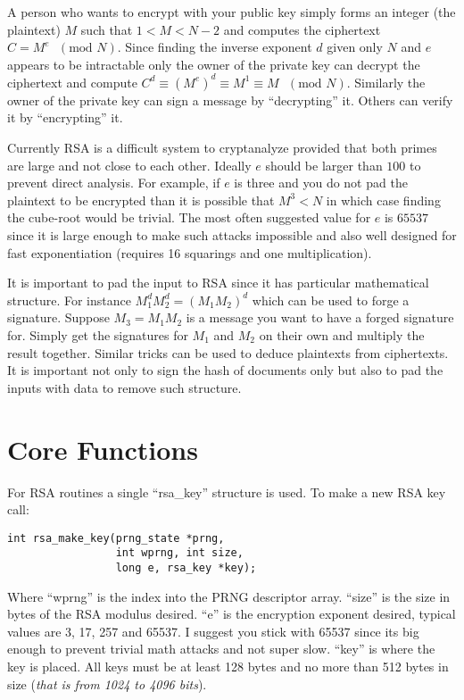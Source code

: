 \documentclass[b5paper]{book}
\begin{document}
A person who wants to encrypt with your public key simply forms an integer (the plaintext) $M$ such that 
$1 < M < N-2$ and computes the ciphertext $C = M^e\mbox{ }(\mbox{mod }N)$.  Since finding the inverse exponent $d$
given only $N$ and $e$ appears to be intractable only the owner of the private key can decrypt the ciphertext and compute
$C^d \equiv \left (M^e \right)^d \equiv M^1 \equiv M\mbox{ }(\mbox{mod }N)$.  Similarly the owner of the private key 
can sign a message by ``decrypting'' it.  Others can verify it by ``encrypting'' it.  

Currently RSA is a difficult system to cryptanalyze provided that both primes are large and not close to each other.  
Ideally $e$ should be larger than $100$ to prevent direct analysis.  For example, if $e$ is three and you do not pad
the plaintext to be encrypted than it is possible that $M^3 < N$ in which case finding the cube-root would be trivial.  
The most often suggested value for $e$ is $65537$ since it is large enough to make such attacks impossible and also well 
designed for fast exponentiation (requires 16 squarings and one multiplication).

It is important to pad the input to RSA since it has particular mathematical structure.  For instance  
$M_1^dM_2^d = (M_1M_2)^d$ which can be used to forge a signature.  Suppose $M_3 = M_1M_2$ is a message you want
to have a forged signature for.  Simply get the signatures for $M_1$ and $M_2$ on their own and multiply the result
together.  Similar tricks can be used to deduce plaintexts from ciphertexts.  It is important not only to sign 
the hash of documents only but also to pad the inputs with data to remove such structure.  

\section{Core Functions}

For RSA routines a single ``rsa\_key'' structure is used.  To make a new RSA key call:
\begin{verbatim}
int rsa_make_key(prng_state *prng, 
                 int wprng, int size, 
                 long e, rsa_key *key);
\end{verbatim}

Where ``wprng'' is the index into the PRNG descriptor array.  ``size'' is the size in bytes of the RSA modulus desired.
``e'' is the encryption exponent desired, typical values are 3, 17, 257 and 65537.  I suggest you stick with 65537 since its big
enough to prevent trivial math attacks and not super slow.  ``key'' is where the key is placed.  All keys must be at 
least 128 bytes and no more than 512 bytes in size (\textit{that is from 1024 to 4096 bits}).
\end{document}
